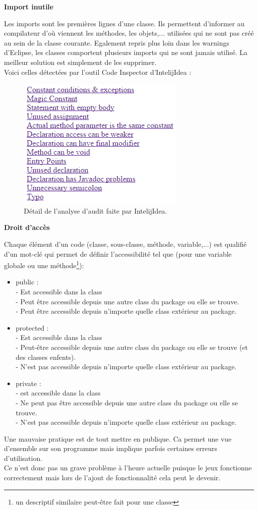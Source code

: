 \documentclass[12pt,a4paper,final]{article}
\newcommand{\smalltitle}[1]{\bigskip\large\textbf{#1}\par\normalsize\medskip}
\begin{document}
\smalltitle{Import inutile}
Les imports sont les premières lignes d'une classe. Ils permettent d'informer au compilateur d'où viennent les méthodes, les objets,... utilisées qui ne sont pas créé au sein de la classe courante.
Egalement repris plus loin dans les warnings d'Eclipse, les classes comportent plusieurs imports qui ne sont jamais utilisé.
La meilleur solution est simplement de les supprimer.\\
Voici celles détectées par l'outil Code Inspector d'IntelijIdea : 
\begin{figure}[!h]
	\centering
	\includegraphics{AuditII.png}
	\caption{\label{Audit}Détail de l'analyse d'audit faite par IntelijIdea.}
\end{figure}

\smalltitle{Droit d'accès}
Chaque élément d'un code (classe, sous-classe, méthode, variable,...) est qualifié d'un mot-clé qui permet de définir l'accessibilité tel que (pour une variable globale ou une méthode\footnote{un descriptif similaire peut-être fait pour une classe}): 
\begin{itemize}
\item public : \\
- Est accessible dans la class\\
- Peut être accessible depuis une autre class du package ou elle se trouve.\\
- Peut être accessible depuis n'importe quelle class extérieur au package.
\item protected :\\
- Est accessible dans la class\\
- Peut-être accessible depuis une autre class du package ou elle se trouve (et des classes enfents).\\
- N'est pas accessible depuis n'importe quelle class extérieur au package.
\item private :\\
- est accessible dans la class\\
- Ne peut pas être accessible depuis une autre class du package ou elle se trouve.\\
- N'est pas accessible depuis n'importe quelle class extérieur au package.
\end{itemize}
Une mauvaise pratique est de tout mettre en publique. Ca permet une vue d'ensemble sur son programme mais implique parfois certaines erreurs d'utilisation.\\
Ce n'est donc pas un grave problème à l'heure actuelle puisque le jeux fonctionne correctement mais lors de l'ajout de fonctionnalité cela peut le devenir.
\end{document}
